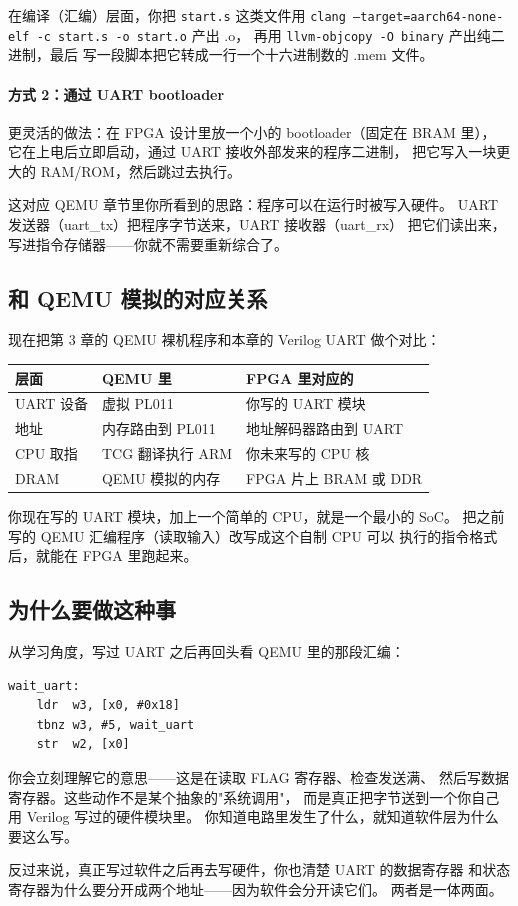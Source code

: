 在编译（汇编）层面，你把 \texttt{start.s} 这类文件用
\texttt{clang --target=aarch64-none-elf -c start.s -o start.o} 产出 .o，
再用 \texttt{llvm-objcopy -O binary} 产出纯二进制，最后
写一段脚本把它转成一行一个十六进制数的 .mem 文件。

\paragraph{方式 2：通过 UART bootloader}
更灵活的做法：在 FPGA 设计里放一个小的 bootloader（固定在 BRAM 里），
它在上电后立即启动，通过 UART 接收外部发来的程序二进制，
把它写入一块更大的 RAM/ROM，然后跳过去执行。

这对应 QEMU 章节里你所看到的思路：程序可以在运行时被写入硬件。
UART 发送器（uart\_tx）把程序字节送来，UART 接收器（uart\_rx）
把它们读出来，写进指令存储器——你就不需要重新综合了。

\subsection{和 QEMU 模拟的对应关系}

现在把第 3 章的 QEMU 裸机程序和本章的 Verilog UART 做个对比：

\begin{center}
\begin{tabular}{l l l}
\hline
层面 & QEMU 里 & FPGA 里对应的 \\
\hline
UART 设备 & 虚拟 PL011 & 你写的 UART 模块 \\
地址 & 内存路由到 PL011 & 地址解码器路由到 UART \\
CPU 取指 & TCG 翻译执行 ARM & 你未来写的 CPU 核 \\
DRAM & QEMU 模拟的内存 & FPGA 片上 BRAM 或 DDR \\
\hline
\end{tabular}
\end{center}

你现在写的 UART 模块，加上一个简单的 CPU，就是一个最小的 SoC。
把之前写的 QEMU 汇编程序（读取输入）改写成这个自制 CPU 可以
执行的指令格式后，就能在 FPGA 里跑起来。

\subsection{为什么要做这种事}

从学习角度，写过 UART 之后再回头看 QEMU 里的那段汇编：

\begin{lstlisting}[style=asm]
wait_uart:
    ldr  w3, [x0, #0x18]
    tbnz w3, #5, wait_uart
    str  w2, [x0]
\end{lstlisting}

你会立刻理解它的意思——这是在读取 FLAG 寄存器、检查发送满、
然后写数据寄存器。这些动作不是某个抽象的"系统调用"，
而是真正把字节送到一个你自己用 Verilog 写过的硬件模块里。
你知道电路里发生了什么，就知道软件层为什么要这么写。

反过来说，真正写过软件之后再去写硬件，你也清楚 UART 的数据寄存器
和状态寄存器为什么要分开成两个地址——因为软件会分开读它们。
两者是一体两面。
